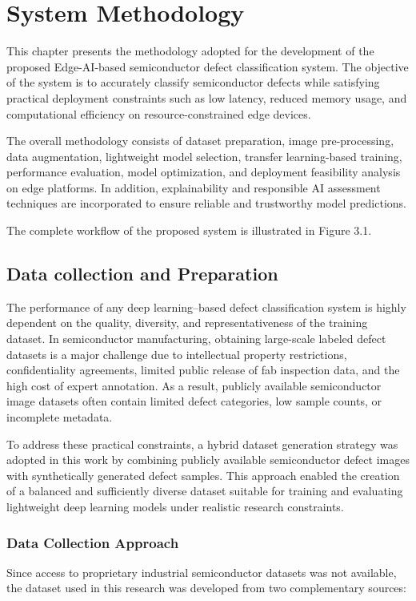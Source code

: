 \chapter{System Methodology}

This chapter presents the methodology adopted for the development of the proposed Edge-AI-based semiconductor defect classification system. The objective of the system is to accurately classify semiconductor defects while satisfying practical deployment constraints such as low latency, reduced memory usage, and computational efficiency on resource-constrained edge devices.

The overall methodology consists of dataset preparation, image pre-processing, data augmentation, lightweight model selection, transfer learning-based training, performance evaluation, model optimization, and deployment feasibility analysis on edge platforms. In addition, explainability and responsible AI assessment techniques are incorporated to ensure reliable and trustworthy model predictions.

The complete workflow of the proposed system is illustrated in Figure 3.1.

\section{Data collection and Preparation}

The performance of any deep learning–based defect classification system is highly dependent on the quality, diversity, and representativeness of the training dataset. In semiconductor manufacturing, obtaining large-scale labeled defect datasets is a major challenge due to intellectual property restrictions, confidentiality agreements, limited public release of fab inspection data, and the high cost of expert annotation. As a result, publicly available semiconductor image datasets often contain limited defect categories, low sample counts, or incomplete metadata.

To address these practical constraints, a hybrid dataset generation strategy was adopted in this work by combining publicly available semiconductor defect images with synthetically generated defect samples. This approach enabled the creation of a balanced and sufficiently diverse dataset suitable for training and evaluating lightweight deep learning models under realistic research constraints.

\subsection{Data Collection Approach}
Since access to proprietary industrial semiconductor datasets was not available, the dataset used in this research was developed from two complementary sources:

